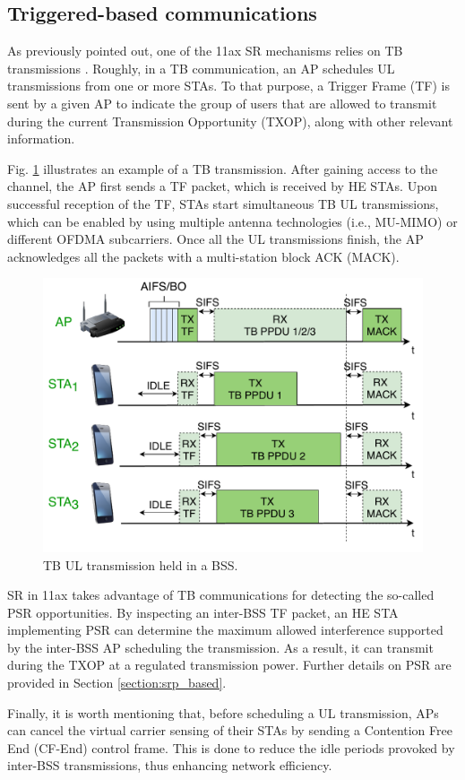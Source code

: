 \documentclass{article}
\begin{document}
\subsection{Triggered-based communications}
\label{section:tb_communication}
As previously pointed out, one of the 11ax SR mechanisms relies on TB transmissions \cite{bellalta2019ap}. Roughly, in a TB communication, an AP schedules UL transmissions from one or more STAs. To that purpose, a Trigger Frame (TF) is sent by a given AP to indicate the group of users that are allowed to transmit during the current Transmission Opportunity (TXOP), along with other relevant information. 

Fig. \ref{fig:TB_transmission_example} illustrates an example of a TB transmission. After gaining access to the channel, the AP first sends a TF packet, which is received by HE STAs. Upon successful reception of the TF, STAs start simultaneous TB UL transmissions, which can be enabled by using multiple antenna technologies (i.e., MU-MIMO) or different OFDMA subcarriers. Once all the UL transmissions finish, the AP acknowledges all the packets with a multi-station block ACK (MACK).

\begin{figure}[ht!]
	\centering
	\includegraphics[width=.55\textwidth]{fig_8}
	\caption{TB UL transmission held in a BSS.}
	\label{fig:TB_transmission_example}
\end{figure}

SR in 11ax takes advantage of TB communications for detecting the so-called PSR opportunities. By inspecting an inter-BSS TF packet, an HE STA implementing PSR can determine the maximum allowed interference supported by the inter-BSS AP scheduling the transmission. As a result, it can transmit during the TXOP at a regulated transmission power. Further details on PSR are provided in Section \ref{section:srp_based}.

Finally, it is worth mentioning that, before scheduling a UL transmission, APs can cancel the virtual carrier sensing of their STAs by sending a Contention Free End (CF-End) control frame. This is done to reduce the idle periods provoked by inter-BSS transmissions, thus enhancing network efficiency. 
\end{document}
